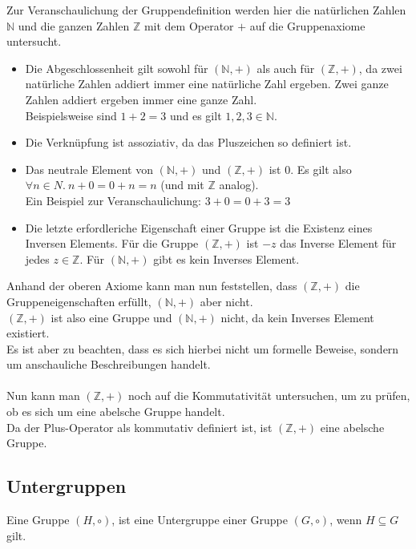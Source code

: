 \documentclass[12pt,a4paper, usenames, dvipsnames]{article}
\begin{document}
Zur Veranschaulichung der Gruppendefinition werden hier die natürlichen Zahlen $\mathbb{N}$ und die ganzen Zahlen $\mathbb{Z}$ mit dem Operator $+$ auf die Gruppenaxiome untersucht.
\begin{itemize}
\item Die Abgeschlossenheit gilt sowohl für $(\mathbb{N},+)$ als auch für $(\mathbb{Z},+)$, da zwei natürliche Zahlen addiert immer eine natürliche Zahl ergeben. Zwei ganze Zahlen addiert ergeben immer eine ganze Zahl. \\
Beispielsweise sind $1+2=3$ und es gilt $1,2,3 \in \mathbb{N}$.
\item Die Verknüpfung ist assoziativ, da das Pluszeichen so definiert ist.
\item Das neutrale Element von $(\mathbb{N},+)$ und $(\mathbb{Z},+)$ ist $0$. Es gilt also $\forall n \in N. \ n + 0 = 0 + n = n$ (und mit $\mathbb{Z}$ analog). \\
Ein Beispiel zur Veranschaulichung: $3+0=0+3=3$
\item Die letzte erfordleriche Eigenschaft einer Gruppe ist die Existenz eines Inversen Elements. Für die Gruppe $(\mathbb{Z},+)$ ist $-z$ das Inverse Element für jedes $z \in \mathbb{Z}$. Für $(\mathbb{N},+)$ gibt es kein Inverses Element.
\end{itemize}
Anhand der oberen Axiome kann man nun feststellen, dass $(\mathbb{Z},+)$ die Gruppeneigenschaften erfüllt, $(\mathbb{N},+)$ aber nicht. \\
$(\mathbb{Z},+)$ ist also eine Gruppe und $(\mathbb{N},+)$ nicht, da kein Inverses Element existiert. \\
Es ist aber zu beachten, dass es sich hierbei nicht um formelle Beweise, sondern um anschauliche Beschreibungen handelt. \\
\\
Nun kann man $(\mathbb{Z},+)$ noch auf die Kommutativität untersuchen, um zu prüfen, ob es sich um eine abelsche Gruppe handelt. \\
Da der Plus-Operator als kommutativ definiert ist, ist $(\mathbb{Z},+)$ eine abelsche Gruppe.

%
%
%
%
%
%
%
%
%
%
\subsection*{Untergruppen} 
Eine Gruppe $(H, \circ)$, ist eine Untergruppe einer Gruppe $(G, \circ)$, wenn $H \subseteq G$ gilt. 
\end{document}
